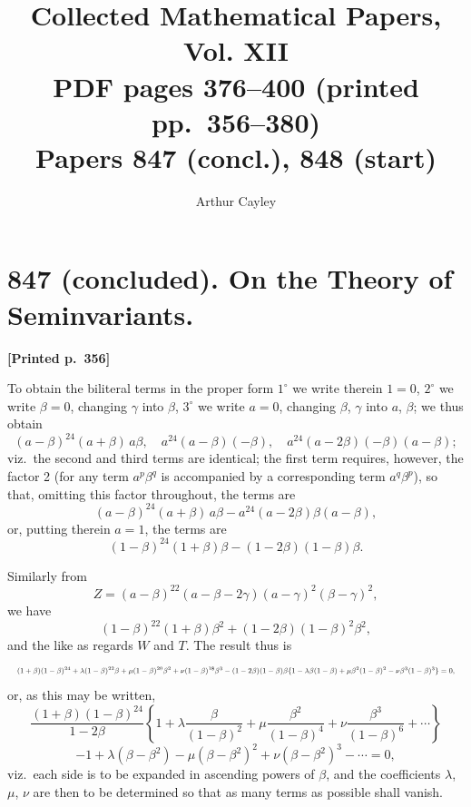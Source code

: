 \documentclass[11pt]{article}
\title{Collected Mathematical Papers, Vol. XII\\ \large PDF pages 376--400 (printed pp.\ 356--380)\\ Papers 847 (concl.), 848 (start)}
\author{Arthur Cayley}
\date{}
\begin{document}
\maketitle


\section*{847 (concluded). On the Theory of Seminvariants.}

\medskip
\noindent\textbf{[Printed p.~356]}\hfill

To obtain the biliteral terms in the proper form $1^{\circ}$ we write therein $1=0$, $2^{\circ}$ we write $\beta=0$, changing $\gamma$ into $\beta$, $3^{\circ}$ we write $a=0$, changing $\beta$, $\gamma$ into $a$, $\beta$; we thus obtain
\[
(a-\beta)^{24}(a+\beta)\,a\beta,\quad a^{24}(a-\beta)(-\beta),\quad a^{24}(a-2\beta)(-\beta)(a-\beta);
\]
viz.\ the second and third terms are identical; the first term requires, however, the factor 2 (for any term $a^{p}\beta^{q}$ is accompanied by a corresponding term $a^{q}\beta^{p}$), so that, omitting this factor throughout, the terms are
\[
(a-\beta)^{24}(a+\beta)\,a\beta - a^{24}(a-2\beta)\beta(a-\beta),
\]
or, putting therein $a=1$, the terms are
\[
(1-\beta)^{24}(1+\beta)\beta - (1-2\beta)(1-\beta)\beta.
\]

Similarly from
\[
Z=(a-\beta)^{22}(a-\beta-2\gamma)(a-\gamma)^{2}(\beta-\gamma)^{2},
\]
we have
\[
(1-\beta)^{22}(1+\beta)\beta^{2} + (1-2\beta)(1-\beta)^{2}\beta^{2},
\]
and the like as regards $W$ and $T$.  The result thus is
\[
\resizebox{\textwidth}{!}{$\displaystyle
(1+\beta)(1-\beta)^{24}+\lambda(1-\beta)^{22}\beta+\mu(1-\beta)^{20}\beta^{2}+\nu(1-\beta)^{18}\beta^{3}
-(1-2\beta)(1-\beta)\beta\{1-\lambda\beta(1-\beta)+\mu\beta^{2}(1-\beta)^{2}-\nu\beta^{3}(1-\beta)^{3}\}=0,
$}
\]
or, as this may be written,
\[
\frac{(1+\beta)(1-\beta)^{24}}{1-2\beta}\left\{1+\lambda\frac{\beta}{(1-\beta)^{2}}+\mu\frac{\beta^{2}}{(1-\beta)^{4}}+\nu\frac{\beta^{3}}{(1-\beta)^{6}}+\cdots\right\}
\]
\[
-1+\lambda(\beta-\beta^{2})-\mu(\beta-\beta^{2})^{2}+\nu(\beta-\beta^{2})^{3}-\cdots=0,
\]
viz.\ each side is to be expanded in ascending powers of $\beta$, and the coefficients $\lambda$, $\mu$, $\nu$ are then to be determined so that as many terms as possible shall vanish.
\end{document}
